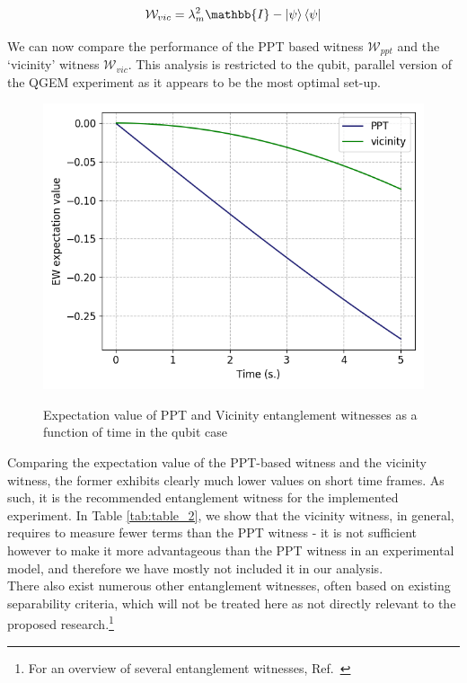 \documentclass[%
 12pt,
 superscriptaddress,
 amsmath,
 amssymb,
 onecolumn,
 longbibliography
]{revtex4-2}
\begin{document}
\begin{appendices}
		\begin{equation}
			\mathcal{W}_{vic}=\lambda_m^2\mathbb{I} - \Ket{\psi}\Bra{\psi}
		\end{equation}

\indent We can now compare the performance of the PPT based witness $\mathcal{W}_{ppt}$ and the `vicinity' witness $\mathcal{W}_{vic}$. This analysis is restricted to the qubit, parallel version of the QGEM experiment as it appears to be the most optimal set-up. 

	\begin{figure}
	\centering
	    \includegraphics[width=0.5\columnwidth]{EW_comparison.png}\par\medskip
	\caption{Expectation value of PPT and Vicinity entanglement witnesses as a function of time in the qubit case}\par\medskip \label{fig:EW_comp}
	\end{figure}

\indent Comparing the expectation value of the PPT-based witness and the vicinity witness, the former exhibits clearly much lower values on short time frames. As such, it is the recommended entanglement witness for the implemented experiment. In Table \ref{tab:table_2}, we show that the vicinity witness, in general, requires to measure fewer terms than the PPT witness - it is not sufficient however to make it more advantageous than the PPT witness in an experimental model, and therefore we have mostly not included it in our analysis. \\
\indent There also exist numerous other entanglement witnesses, often based on existing separability criteria, which will not be treated here as not directly relevant to the proposed research.\footnote{For an overview of several entanglement witnesses, Ref.~\cite{Guhne2009}}


\end{appendices}
\end{document}
